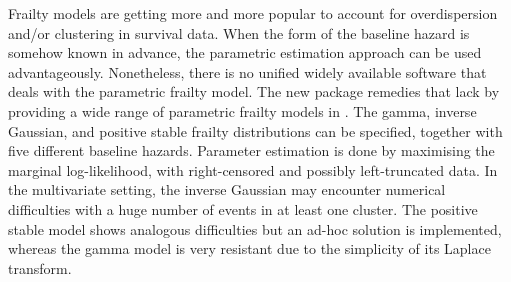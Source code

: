 Frailty models are getting more and more popular to account for overdispersion and/or clustering in survival data.
When the form of the baseline hazard is somehow known in advance, the parametric estimation approach can be used advantageously.
Nonetheless, there is no unified widely available software that deals with the parametric frailty model.
The new  package remedies that lack by providing a wide range of parametric frailty models in .
The gamma, inverse Gaussian, and positive stable frailty distributions can be specified, together with five different baseline hazards.
Parameter estimation is done by maximising the marginal log-likelihood, with right-censored and possibly left-truncated data.
In the multivariate setting, the inverse Gaussian may encounter numerical difficulties with a huge number of events in at least one cluster.
The positive stable model shows analogous difficulties but an ad-hoc solution is implemented, whereas the gamma model is very resistant due to the simplicity of its Laplace transform.